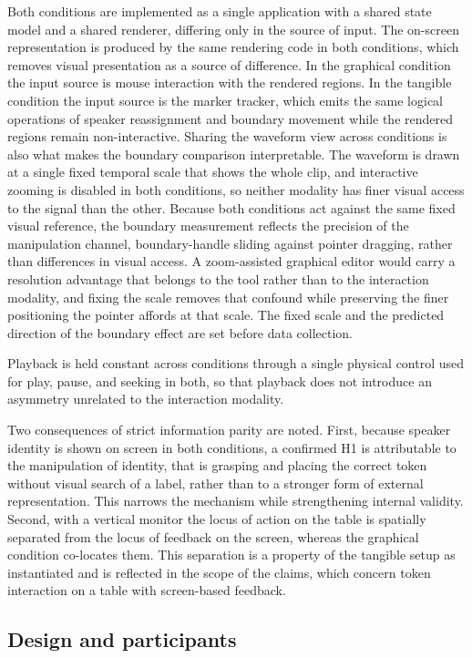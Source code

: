 \documentclass[10pt,a4paper,twocolumn]{article}
\begin{document}
Both conditions are implemented as a single application with a
shared state model and a shared renderer, differing only in the
source of input. The on-screen representation is produced by the
same rendering code in both conditions, which removes visual
presentation as a source of difference. In the graphical
condition the input source is mouse interaction with the rendered
regions. In the tangible condition the input source is the marker
tracker, which emits the same logical operations of speaker
reassignment and boundary movement while the rendered regions
remain non-interactive. Sharing the waveform view across
conditions is also what makes the boundary comparison
interpretable. The waveform is drawn at a single fixed temporal scale that shows
the whole clip, and interactive zooming is disabled in both
conditions, so neither modality has finer visual access to the
signal than the other. Because both conditions act against the
same fixed visual reference, the boundary measurement reflects the
precision of the manipulation channel, boundary-handle sliding
against pointer dragging, rather than differences in visual
access. A zoom-assisted graphical editor would carry a resolution
advantage that belongs to the tool rather than to the interaction
modality, and fixing the scale removes that confound while
preserving the finer positioning the pointer affords at that
scale. The fixed scale and the predicted direction of the boundary
effect are set before data collection.

Playback is held constant across conditions through a single
physical control used for play, pause, and seeking in both, so
that playback does not introduce an asymmetry unrelated to the
interaction modality.

Two consequences of strict information parity are noted. First,
because speaker identity is shown on screen in both conditions, a
confirmed H1 is attributable to the manipulation of identity,
that is grasping and placing the correct token without visual
search of a label, rather than to a stronger form of external
representation. This narrows the mechanism while strengthening
internal validity. Second, with a vertical monitor the locus of
action on the table is spatially separated from the locus of
feedback on the screen, whereas the graphical condition
co-locates them. This separation is a property of the tangible
setup as instantiated and is reflected in the scope of the
claims, which concern token interaction on a table with
screen-based feedback.

\subsection{Design and participants}
\label{sec:method-design}
\end{document}
